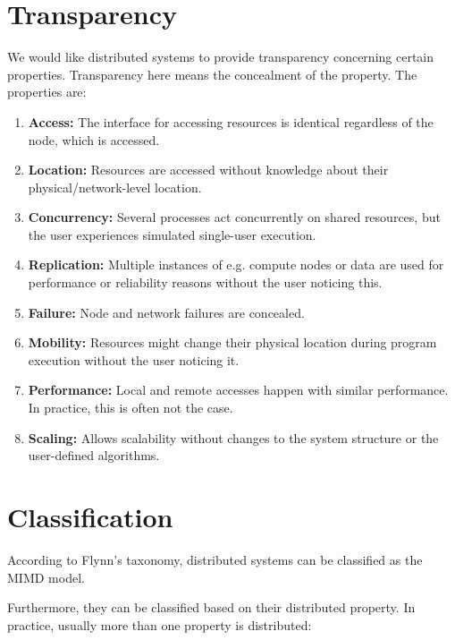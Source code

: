\section{Transparency}

We would like distributed systems to provide transparency concerning certain properties. Transparency here means the concealment of the property. The properties are:

\begin{enumerate}
    \item \textbf{Access:} The interface for accessing resources is identical regardless of the node, which is accessed.
    \item \textbf{Location:} Resources are accessed without knowledge about their physical/network-level location.
    \item \textbf{Concurrency:} Several processes act concurrently on shared resources, but the user experiences simulated single-user execution.
    \item \textbf{Replication:} Multiple instances of e.g. compute nodes or data are used for performance or reliability reasons without the user noticing this.
    \item \textbf{Failure:} Node and network failures are concealed.
    \item \textbf{Mobility:} Resources might change their physical location during program execution without the user noticing it.
    \item \textbf{Performance:} Local and remote accesses happen with similar performance. In practice, this is often not the case.
    \item \textbf{Scaling:} Allows scalability without changes to the system structure or the user-defined algorithms.
\end{enumerate}

\section{Classification}

According to Flynn's taxonomy, distributed systems can be classified as the \ac{MIMD} model.

Furthermore, they can be classified based on their distributed property. In practice, usually more than one property is distributed:

